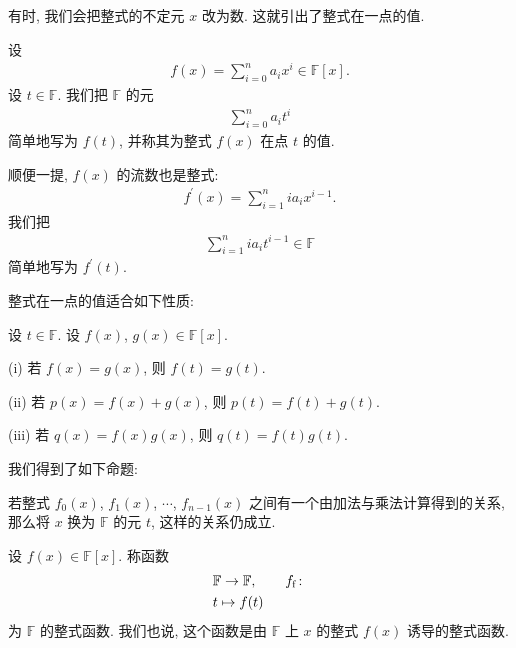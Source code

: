 有时, 我们会把整式的不定元 $x$ 改为数. 这就引出了整式在一点的值.

\begin{definition}
    设
    \begin{align*}
        f(x) = \sum_{i=0}^n a_i x^i \in \mathbb{F}[x].
    \end{align*}
    设 $t \in \mathbb{F}$. 我们把 $\mathbb{F}$ 的元
    \begin{align*}
        \sum_{i=0}^n a_i t^i
    \end{align*}
    简单地写为 $f(t)$, 并称其为整式 $f(x)$ 在点 $t$ 的值.

    顺便一提, $f(x)$ 的流数也是整式:
    \begin{align*}
        f^{\prime} (x) = \sum_{i = 1}^{n} i a_i x^{i - 1}.
    \end{align*}
    我们把
    \begin{align*}
        \sum_{i = 1}^{n} i a_i t^{i - 1} \in \mathbb{F}
    \end{align*}
    简单地写为 $f^{\prime} (t)$.
\end{definition}

整式在一点的值适合如下性质:
\begin{proposition}
    设 $t \in \mathbb{F}$. 设 $f(x)$, $g(x) \in \mathbb{F}[x]$.

    (i) 若 $f(x) = g(x)$, 则 $f(t) = g(t)$.

    (ii) 若 $p(x) = f(x) + g(x)$, 则 $p(t) = f(t) + g(t)$.

    (iii) 若 $q(x) = f(x) g(x)$, 则 $q(t) = f(t) g(t)$.
\end{proposition}

我们得到了如下命题:
\begin{proposition}
    若整式 $f_0 (x)$, $f_1 (x)$, $\cdots$, $f_{n-1} (x)$ 之间有一个由加法与乘法计算得到的关系, 那么将 $x$ 换为 $\mathbb{F}$ 的元 $t$, 这样的关系仍成立.
\end{proposition}

\begin{definition}
    设 $f(x) \in \mathbb{F}[x]$. 称函数
    \begin{align*}
         & \mathbb{F} \to \mathbb{F}, \tag*{$f_\mathrm{f} \colon$} \\
         & t \mapsto f(t)
    \end{align*}
    为 $\mathbb{F}$ 的整式函数. 我们也说, 这个函数是由 $\mathbb{F}$ 上 $x$ 的整式 $f(x)$ 诱导的整式函数.
\end{definition}

